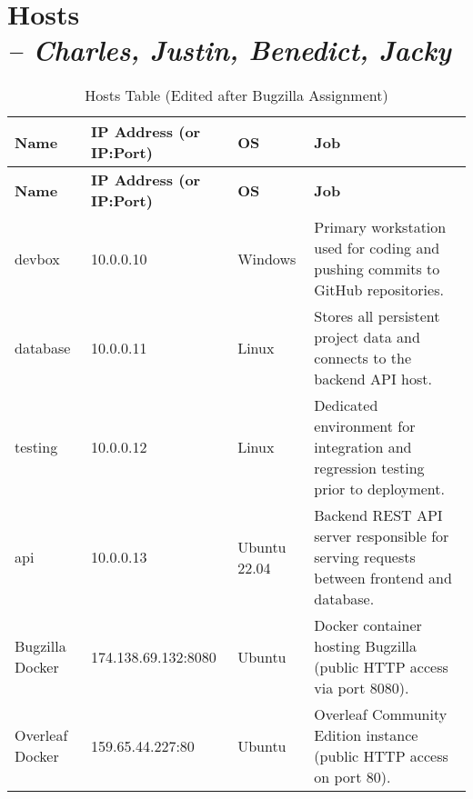 \chapter[Hosts]{Hosts\\\small{\textit{-- Charles, Justin, Benedict, Jacky}}}
\label{Chapter::Hosts}

\begin{longtable}{|p{2.5cm}||p{5cm}||p{2.5cm}||p{6.5cm}|}
\caption{Hosts Table (Edited after Bugzilla Assignment)\label{Table::HostsTable}}\\
\hline
\textbf{Name} & \textbf{IP Address (or IP:Port)} & \textbf{OS} & \textbf{Job} \\
\hline
\endfirsthead
\hline
\textbf{Name} & \textbf{IP Address (or IP:Port)} & \textbf{OS} & \textbf{Job} \\
\hline
\endhead

devbox & 10.0.0.10 & Windows & Primary workstation used for coding and pushing commits to GitHub repositories. \\
\hline

database & 10.0.0.11 & Linux & Stores all persistent project data and connects to the backend API host. \\
\hline

testing & 10.0.0.12 & Linux & Dedicated environment for integration and regression testing prior to deployment. \\
\hline

api & 10.0.0.13 & Ubuntu 22.04 & Backend REST API server responsible for serving requests between frontend and database. \\
\hline

Bugzilla Docker & 174.138.69.132:8080 & Ubuntu & Docker container hosting Bugzilla (public HTTP access via port 8080). \\
\hline

Overleaf Docker & 159.65.44.227:80 & Ubuntu & Overleaf Community Edition instance (public HTTP access on port 80). \\
\hline

\end{longtable}
